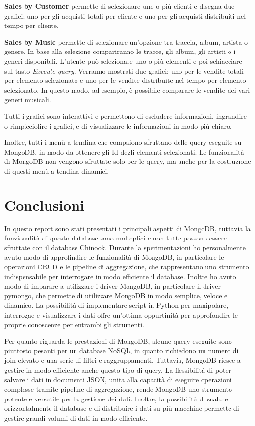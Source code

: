 \documentclass{article}
\begin{document}
\textbf{Sales by Customer} permette di selezionare uno o più clienti e disegna due grafici: uno per gli acquisti totali per cliente e uno per gli acquisti distribuiti nel tempo per cliente.

\textbf{Sales by Music} permette di selezionare un'opzione tra traccia, album, artista o genere. In base alla selezione compariranno le tracce, gli album, gli artisti o i generi
disponibili. L'utente può selezionare uno o più elementi e poi schiacciare sul tasto \textit{Execute query}. Verranno mostrati due grafici: uno per le vendite totali
per elemento selezionato e uno per le vendite distribuite nel tempo per elemento selezionato. In questo modo, ad esempio, è possibile comparare le vendite dei vari generi musicali.


Tutti i grafici sono interattivi e permettono di escludere informazioni, ingrandire o rimpicciolire i grafici, e di visualizzare le informazioni in modo più chiaro.

Inoltre, tutti i menù a tendina che compaiono sfruttano delle query eseguite su MongoDB, in modo da ottenere gli Id degli elementi selezionati. Le funzionalità
di MongoDB non vengono sfruttate solo per le query, ma anche per la costruzione di questi menù a tendina dinamici.    


\section{Conclusioni}
In questo report sono stati presentati i principali aspetti di MongoDB, tuttavia la funzionalità di questo database sono molteplici e non tutte
possono essere sfruttate con il database Chinook. Durante la sperimentazioni ho personalmente avuto modo di approfindire le funzionalità
di MongoDB, in particolare le operazioni CRUD e le pipeline di aggregazione, che rappresentano uno strumento indispensabile per interrogare
in modo efficiente il database. Inoltre ho avuto modo di imparare a utilizzare i driver MongoDB, in particolare il driver pymongo, che permette
di utilizzare MongoDB in modo semplice, veloce e dinamico. La possibilità di implementare script in Python per manipolare, interrogae e visualizzare
i dati offre un'ottima oppurtinità per approfondire le proprie conoscenze per entrambi gli strumenti.

Per quanto riguarda le prestazioni di MongoDB, alcune query eseguite sono piuttosto pesanti per un database NoSQL, in quanto richiedono
un numero di join elevato e una serie di filtri e raggruppamenti. Tuttavia, MongoDB riesce a gestire in modo efficiente anche questo tipo di query. 
La flessibilità di poter salvare i dati in documenti JSON, unita alla capacità di eseguire operazioni complesse tramite pipeline di aggregazione,
rende MongoDB uno strumento potente e versatile per la gestione dei dati. Inoltre, la possibilità di scalare orizzontalmente il database
e di distribuire i dati su più macchine permette di gestire grandi volumi di dati in modo efficiente.
\end{document}
